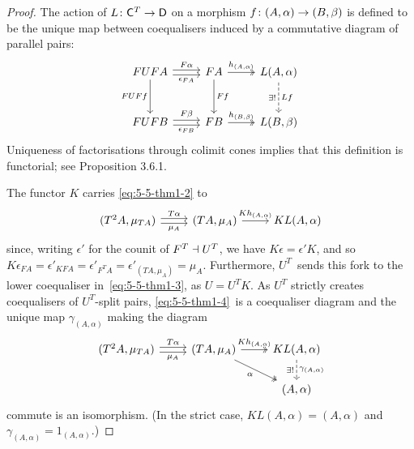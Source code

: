 \documentclass[../../solutions]{subfiles}
\begin{document}
\begin{proof}[Proof]
  The action of ${L}\colon{{\mathsf{C}}^T}\to{{\mathsf{D}}}$ on a morphism
  ${f}\colon{(A,\alpha)}\to{(B,\beta)}$ is defined to be the unique map
  between coequalisers induced by a commutative diagram of parallel
  pairs:
  $$
  \begin{tikzcd}[row sep=large]
    FUFA
    \ar[r, shift left=0.5ex, "F\alpha"]
    \ar[r, shift right=0.5ex, "\epsilon_{FA}"']
    \ar[d, "FUFf"']
    & FA
    \ar[r, twoheadrightarrow, "h_{(A,\alpha)}"]
    \ar[d, "Ff"]
    & L(A,\alpha)
    \ar[d, dashed, "\exists!"', "Lf"]
    \\
    FUFB
    \ar[r, shift left=0.5ex, "F\beta"]
    \ar[r, shift right=0.5ex, "\epsilon_{FB}"']
    & FB
    \ar[r, twoheadrightarrow, "h_{(B,\beta)}"]
    & L(B,\beta)
  \end{tikzcd}
  $$
  Uniqueness of factorisations through colimit cones implies that this
  definition is functorial; see Proposition 3.6.1.

  The functor $K$ carries \eqref{eq:5-5-thm1-2} to
  \begin{equation}
    \label{eq:5-5-thm1-4}
    \begin{tikzcd}
      (T^2A,\mu_{TA})
      \ar[r, shift left=0.5ex, "T\alpha"]
      \ar[r, shift right=0.5ex, "\mu_A"']
      & (TA,\mu_A)
      \ar[r, "Kh_{(A,\alpha)}"]
      & KL(A,\alpha)
    \end{tikzcd}
  \end{equation}
  since, writing $\epsilon'$ for the counit of $F^T\dashv U^T$, we have
  $K\epsilon=\epsilon' K$, and so
  $K\epsilon_{FA}= \epsilon'_{KFA}= \epsilon'_{F^TA}=
  \epsilon'_{(TA,\mu_A)}= \mu_A$.  Furthermore, $U^T$~sends this fork
  to the lower coequaliser in~\eqref{eq:5-5-thm1-3}, as $U=U^TK$.  As
  $U^T$ strictly creates coequalisers of $U^T$-split pairs,
  \eqref{eq:5-5-thm1-4}~is a coequaliser diagram and the unique map
  $\gamma_{(A,\alpha)}$ making the diagram
  $$
  \begin{tikzcd}
    (T^2A,\mu_{TA})
    \ar[r, shift left=0.5ex, "T\alpha"]
    \ar[r, shift right=0.5ex, "\mu_A"']
    & (TA,\mu_A)
    \ar[r, twoheadrightarrow, "Kh_{(A,\alpha)}"]
    \ar[rd, twoheadrightarrow, "\alpha"']
    & KL(A,\alpha)
    \ar[d, dashed, "\exists!"', "\gamma_{(A,\alpha)}"]
    \\
    && (A,\alpha)
  \end{tikzcd}
  $$
  commute is an isomorphism.  (In the strict case,
  $KL(A,\alpha)=(A,\alpha)$ and $\gamma_{(A,\alpha)}=1_{(A,\alpha)}$.)


\end{proof}
\end{document}
